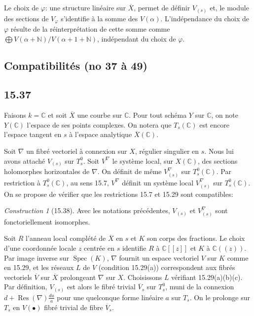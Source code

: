 \documentclass[12pt,a4paper]{article}
\theoremstyle{plain}
\theoremstyle{definition}
\theoremstyle{remark}
\newtheorem{construction}[theorem]{Construction}
\DeclareMathOperator{\Spec}{Spec}
\DeclareMathOperator{\Res}{Res}
\newcommand{\bC}{\mathbb{C}}
\newcommand{\bN}{\mathbb{N}}
\begin{document}
Le choix de $\varphi$: une structure linéaire sur $\overline{X}$, permet de définir $V_{(s)}$ et, le module des sections de $V_\varphi$ s'identifie à la somme des $V(\alpha)$. L'indépendance du choix de $\varphi$ résulte de la réinterprétation de cette somme comme $\bigoplus V(\alpha + \bN)/V(\alpha + 1 + \bN)$, indépendant du choix de $\varphi$.


\subsection*{Compatibilités (no 37 à 49)}

\subsection*{15.37}

Faisons $k = \bC$ et soit $\overline{X}$ une courbe sur $\bC$. Pour tout schéma $Y$ sur $\bC$, on note $Y(\bC)$ l'espace de ses points complexes. On notera que $T_s(\bC)$ est encore l'espace tangent en $s$ à l'espace analytique $\overline{X}(\bC)$.

Soit $\nabla$ un fibré vectoriel à connexion sur $X$, régulier singulier en $s$. Nous lui avons attaché $V_{(s)}$ sur $T_s^0$. Soit $V^\nabla$ le système local, sur $X(\bC)$, des sections holomorphes horizontales de $\nabla$. On définit de même $V_{(s)}^\nabla$ sur $T_s^0(\bC)$. Par restriction à $T_s^0(\bC)$, au sens 15.7, $V^\nabla$ définit un système local $V_{(s)}^\nabla$ sur $T_s^0(\bC)$. On se propose de vérifier que les restrictions 15.7 et 15.29 sont compatibles:

\begin{construction}[15.38]
Avec les notations précédentes, $V_{(s)}$ et $V^\nabla_{(s)}$ sont fonctoriellement isomorphes.
\end{construction}

Soit $R$ l'anneau local complété de $\overline{X}$ en $s$ et $K$ son corps des fractions. Le choix d'une coordonnée locale $z$ centrée en $s$ identifie $R$ à $\bC[[z]]$ et $K$ à $\bC((z))$. Par image inverse sur $\Spec(K)$, $\nabla$ fournit un espace vectoriel $V$ sur $K$ comme en 15.29, et les réseaux $L$ de $V$ (condition 15.29(a)) correspondent aux fibrés vectoriels $\overline{V}$ sur $\overline{X}$ prolongeant $\nabla$ sur $X$. Choisissons $L$ vérifiant 15.29(a)(b)(c). Par définition, $V_{(s)}$ est alors le fibré trivial $\overline{V}_s$ sur $T_s^0$, muni de la connexion $d + \Res(\nabla) \frac{da}{a}$ pour une quelconque forme linéaire $a$ sur $T_s$. On le prolonge sur $T_s$ en $V(\bullet)$ fibré trivial de fibre $\overline{V}_s$.
\end{document}
